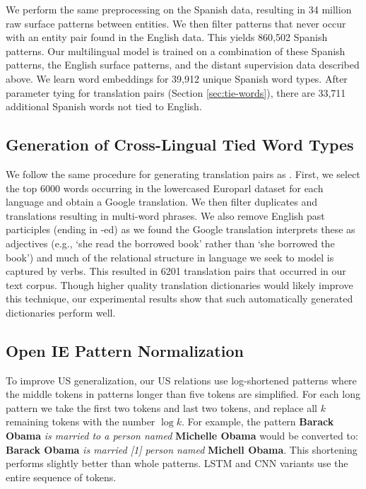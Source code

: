 We perform the same preprocessing on the Spanish data, resulting in 34 million raw surface patterns between entities.
We then filter patterns that never occur with an entity pair found in the English data.  This yields 860,502 Spanish patterns.
Our multilingual model is trained on a combination of these Spanish patterns, the English surface patterns, and the distant supervision data described above.
We learn word embeddings for 39,912 unique Spanish word types.
After parameter tying for translation pairs (Section \ref{sec:tie-words}),  there are 33,711 additional Spanish words not tied to English.


\subsection{Generation of Cross-Lingual Tied Word Types}
\label{sec:word-tying}
We follow the same procedure for generating translation pairs as \cite{mikolov2013}. First, we select the top 6000 words occurring in the lowercased Europarl dataset for each language and obtain a Google translation. We then filter duplicates and translations resulting in multi-word phrases. We also remove English past participles (ending in -ed) as we found the Google translation interprets these as adjectives (e.g.,  `she read the borrowed book' rather than `she borrowed the book') and much of the relational structure in language we seek to model is captured by verbs. This resulted in 6201 translation pairs that occurred in our text corpus. Though higher quality translation dictionaries would likely improve this technique, our experimental results show that such automatically generated dictionaries perform well.


\subsection{Open IE Pattern Normalization}
\label{sec:norm}
To improve US generalization, our US relations use log-shortened patterns where the middle tokens in patterns longer than five tokens are simplified. For each long pattern we take the first two tokens and last two tokens, and replace all $k$ remaining tokens with the number $\log k$. For example, the pattern {\bf Barack Obama} {\it is married to a person named} {\bf Michelle Obama} would be converted to: {\bf Barack Obama} {\it is married [1] person named} {\bf Michell Obama}. This shortening performs slightly better than whole patterns. LSTM and CNN variants use the entire sequence of tokens.

